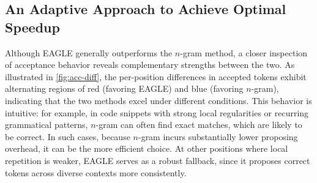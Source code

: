 

\subsection{An Adaptive Approach to Achieve Optimal Speedup}
Although EAGLE generally outperforms the $n$-gram method, 
a closer inspection of acceptance behavior reveals complementary strengths between the two. 
As illustrated in \autoref{fig:acc-diff}, the per-position differences in accepted tokens exhibit alternating regions of red (favoring EAGLE) and blue (favoring $n$-gram), indicating that the two methods excel under different conditions. This behavior is intuitive: for example, in code snippets with strong local regularities or recurring grammatical patterns, $n$-gram can often find exact matches, which are likely to be correct.
In such cases, because $n$-gram incurs substantially lower proposing overhead, it can be the more efficient choice. At other positions where local repetition is weaker, EAGLE serves as a robust fallback, since it proposes correct tokens across diverse contexts more consistently.



